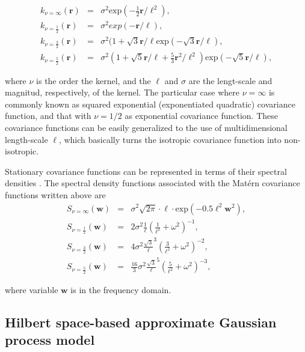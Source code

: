 \documentclass[]{interact}
\theoremstyle{plain}%
\theoremstyle{definition}
\theoremstyle{remark}
\begin{document}
%
\begin{eqnarray}
k_{\nu=\infty}(\mathbf{r})&=&\sigma^2 \text{exp}(-\frac{1}{2} \mathbf{r}/\ell^2), \nonumber \\
k_{\nu=\frac{1}{2}}(\mathbf{r})&=&\sigma^2 exp(-\mathbf{r}/\ell), \nonumber \\
k_{\nu=\frac{3}{2}}(\mathbf{r})&=&\sigma^2(1+\sqrt{3}\mathbf{r}/\ell \text{exp}(-\sqrt{3}\mathbf{r}/\ell), \nonumber \\
k_{\nu=\frac{5}{2}}(\mathbf{r})&=&\sigma^2(1+\sqrt{5}\mathbf{r}/\ell+\frac{5}{3}\mathbf{r}^2/\ell^2) \text{exp}(-\sqrt{5}\mathbf{r}/\ell), \nonumber 
\end{eqnarray}

\noindent where $\nu$ is the order the kernel, and the $\ell$ and $\sigma$ are the lengt-scale and magnitud, respectively, of the kernel. The particular case where $\nu=\infty$ is commonly known as squared exponential (exponentiated quadratic) covariance function, and that with $\nu=1/2$ as exponential covariance function. These covariance functions can be easily generalized to the use of multidimensional length-scale $\boldsymbol{\ell}$, which basically turns the isotropic covariance function into non-isotropic. 

Stationary covariance functions can be represented in terms of their spectral densities \citep{Rasmussen_2006}. The spectral density functions associated with the Mat\'ern covariance functions written above are
%
\begin{eqnarray}
S_{\nu=\infty}(\mathbf{w})&=& \sigma^2 \sqrt{2\pi} \cdot \ell \cdot \text{exp}(-0.5 \ell^2 \mathbf{w}^2), \nonumber \\
S_{\nu=\frac{1}{2}}(\mathbf{w})&=& 2\sigma^2 \frac{1}{\ell}(\frac{1}{\ell^2} + \omega^2)^{-1}, \nonumber \\
S_{\nu=\frac{3}{2}}(\mathbf{w})&=& 4\sigma^2 \frac{\sqrt{3}}{\ell}^{3}(\frac{3}{\ell^2} + \omega^2)^{-2}, \nonumber \\
S_{\nu=\frac{5}{2}}(\mathbf{w})&=& \frac{16}{3}\sigma^2 \frac{\sqrt{3}}{\ell}^{5}(\frac{5}{\ell^2} + \omega^2)^{-3}, \nonumber 
\end{eqnarray}

\noindent where variable $\mathbf{w}$ is in the frequency domain.


\subsection{Hilbert space-based approximate Gaussian process model}
\end{document}
